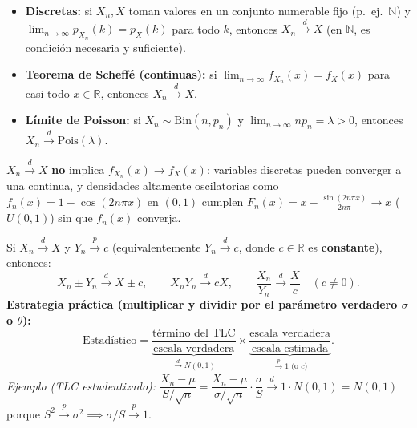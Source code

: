 \documentclass[10pt,a4paper]{article}
\newcommand{\R}{\mathbb{R}}
\newcommand{\dto}{\xrightarrow{\;d\;}}
\newcommand{\pto}{\xrightarrow{\;p\;}}
\begin{document}
\begin{thmbox}[frametitle={Teorema de Scheffé, criterio discreto y límite de Poisson}]
\begin{itemize}
  \item \textbf{Discretas:} si $X_n, X$ toman valores en un conjunto numerable fijo (p.\ ej.\ $\mathbb{N}$) y $\lim_{n\to\infty} p_{X_n}(k) = p_X(k)$ para todo $k$, entonces $X_n \dto X$ (en $\mathbb{N}$, es condición necesaria y suficiente).
  \item \textbf{Teorema de Scheffé (continuas):} si $\lim_{n\to\infty} f_{X_n}(x) = f_X(x)$ para casi todo $x \in \R$, entonces $X_n \dto X$.
  \item \textbf{Límite de Poisson:} si $X_n \sim \text{Bin}(n, p_n)$ y $\lim_{n\to\infty} n p_n = \lambda > 0$, entonces $X_n \dto \text{Pois}(\lambda)$.
\end{itemize}
\end{thmbox}

\begin{warnbox}[frametitle={¡Cuidado! El recíproco del Teorema de Scheffé es falso}]
$X_n \dto X$ \textbf{no} implica $f_{X_n}(x) \to f_X(x)$: variables discretas pueden converger a una continua, y densidades altamente oscilatorias como $f_n(x) = 1 - \cos(2n\pi x)$ en $(0,1)$ cumplen $F_n(x) = x - \frac{\sin(2n\pi x)}{2n\pi} \to x$ ($U(0,1)$) sin que $f_n(x)$ converja.
\end{warnbox}

\begin{thmbox}[frametitle={Teorema de Slutsky y estrategia de multiplicar y dividir}]
Si $X_n \dto X$ y $Y_n \pto c$ (equivalentemente $Y_n \dto c$, donde $c \in \R$ es \textbf{constante}), entonces:
\[
X_n \pm Y_n \dto X \pm c, \qquad X_n Y_n \dto c X, \qquad \frac{X_n}{Y_n} \dto \frac{X}{c} \quad (c \ne 0).
\]
\textbf{Estrategia práctica (multiplicar y dividir por el parámetro verdadero $\sigma$ o $\theta$):}
\[
\text{Estadístico} = \underbrace{\frac{\text{término del TLC}}{\text{escala verdadera}}}_{\dto N(0,1)} \times \underbrace{\frac{\text{escala verdadera}}{\text{escala estimada}}}_{\pto 1 \text{ (o } c\text{)}}.
\]
\textit{Ejemplo (TLC estudentizado):} $\dfrac{\bar X_n - \mu}{S/\sqrt{n}} = \dfrac{\bar X_n - \mu}{\sigma/\sqrt{n}} \cdot \dfrac{\sigma}{S} \dto 1 \cdot N(0,1) = N(0,1)$ porque $S^2 \pto \sigma^2 \implies \sigma/S \pto 1$.
\end{thmbox}
\end{document}

